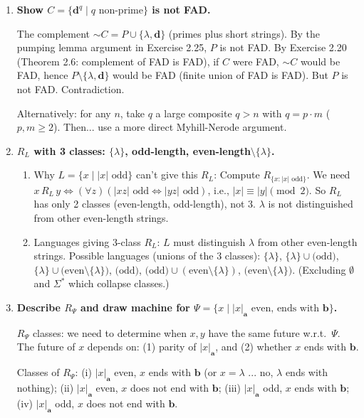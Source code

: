 \begin{enumerate}[{2.}1.]
\item \textbf{Show $C=\{\mathbf{d}^q\mid q\text{ non-prime}\}$ is not FAD.}

The complement $\sim C=P\cup\{\lambda,\mathbf{d}\}$ (primes plus short strings). By the pumping lemma argument in Exercise 2.25, $P$ is not FAD. By Exercise 2.20 (Theorem 2.6: complement of FAD is FAD), if $C$ were FAD, $\sim C$ would be FAD, hence $P\setminus\{\lambda,\mathbf{d}\}$ would be FAD (finite union of FAD is FAD). But $P$ is not FAD. Contradiction.

Alternatively: for any $n$, take $q$ a large composite $q>n$ with $q=p\cdot m$ ($p,m\geq 2$). Then... use a more direct Myhill-Nerode argument.

\item \textbf{$R_L$ with 3 classes: $\{\lambda\}$, odd-length, even-length$\setminus\{\lambda\}$.}

\begin{enumerate}
\item Why $L=\{x\mid|x|\text{ odd}\}$ can't give this $R_L$: Compute $R_{\{x:|x|\text{ odd}\}}$. We need $x\,R_L\,y\Leftrightarrow(\forall z)(|xz|\text{ odd}\Leftrightarrow|yz|\text{ odd})$, i.e., $|x|\equiv|y|\pmod 2$. So $R_L$ has only 2 classes (even-length, odd-length), not 3. $\lambda$ is not distinguished from other even-length strings.

\item Languages giving 3-class $R_L$: $L$ must distinguish $\lambda$ from other even-length strings. Possible languages (unions of the 3 classes):
$\{\lambda\}$, $\{\lambda\}\cup\text{(odd)}$, $\{\lambda\}\cup\text{(even}\setminus\{\lambda\})$, $\text{(odd)}$, $\text{(odd)}\cup(\text{even}\setminus\{\lambda\})$, $\text{(even}\setminus\{\lambda\})$.
(Excluding $\emptyset$ and $\Sigma^*$ which collapse classes.)
\end{enumerate}

\item \textbf{Describe $R_\Psi$ and draw machine for $\Psi=\{x\mid|x|_\mathbf{a}\text{ even, ends with }\mathbf{b}\}$.}

$R_\Psi$ classes: we need to determine when $x,y$ have the same future w.r.t.\ $\Psi$. The future of $x$ depends on: (1) parity of $|x|_\mathbf{a}$, and (2) whether $x$ ends with $\mathbf{b}$.

Classes of $R_\Psi$: (i) $|x|_\mathbf{a}$ even, $x$ ends with $\mathbf{b}$ (or $x=\lambda$ ... no, $\lambda$ ends with nothing); (ii) $|x|_\mathbf{a}$ even, $x$ does not end with $\mathbf{b}$; (iii) $|x|_\mathbf{a}$ odd, $x$ ends with $\mathbf{b}$; (iv) $|x|_\mathbf{a}$ odd, $x$ does not end with $\mathbf{b}$.


\end{enumerate}
